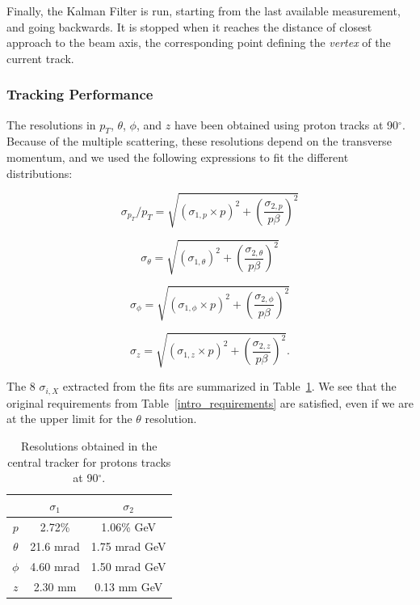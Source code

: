 Finally, the Kalman Filter is run, starting from the last available measurement, and 
going backwards.  It is stopped when it reaches the distance of closest approach to 
the beam axis, the corresponding point defining the \emph{vertex} of the current 
track.

\subsubsection{Tracking Performance}

The resolutions in $p_T$, $\theta$, $\phi$, and $z$ have been obtained using proton 
tracks at 90$^\circ$.  Because of the multiple scattering, these resolutions depend 
on the transverse momentum, and we used the following expressions to fit the different 
distributions:

\begin{equation}
\sigma_{p_T}/p_T = \sqrt{\left(\sigma_{1,p}\times p\right)^2
+\left(\frac{\sigma_{2,p}}{p\beta}\right)^2}
\end{equation}

\begin{equation}
\sigma_{\theta} = \sqrt{\left(\sigma_{1,\theta}\right)^2
+\left(\frac{\sigma_{2,\theta}}{p\beta}\right)^2}
\end{equation}

\begin{equation}
\sigma_{\phi} = \sqrt{\left(\sigma_{1,\phi}\times p\right)^2
+\left(\frac{\sigma_{2,\phi}}{p\beta}\right)^2}
\end{equation}

\begin{equation}
\sigma_{z} = \sqrt{\left(\sigma_{1,z}\times p\right)^2
+\left(\frac{\sigma_{2,z}}{p\beta}\right)^2}.
\end{equation}

\noindent
The 8 $\sigma_{i,X}$ extracted from the fits are summarized in 
Table~\ref{sec_central:table_resol}.  We see that the original requirements from 
Table~\ref{intro_requirements} are satisfied, even if we are at the upper limit for 
the $\theta$ resolution.

\begin{table}[ht!]
\centering
\begin{tabular}{|c|c|c|}\hline
                   &  $\sigma_1$ &  $\sigma_2$   \\ \hline
$p$                & 2.72\%      &  1.06\% GeV    \\
$\theta$           & 21.6 mrad   &  1.75 mrad GeV  \\
$\phi$             & 4.60 mrad   &  1.50 mrad GeV  \\
$z$                & 2.30 mm     &  0.13 mm GeV    \\ \hline
\end{tabular}
\caption{\small{Resolutions obtained in the central tracker for protons tracks at 
90$^\circ$.}}
\label{sec_central:table_resol}
\end{table}

